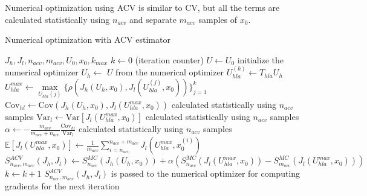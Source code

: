 \documentclass{article}
\begin{document}
Numerical optimization using ACV is similar to CV, but all the terms are calculated statistically using $n_{acv}$ and separate
$m_{acv}$ samples of $x_0$.

\begin{algorithm}
  \caption{Numerical optimization with ACV estimator}
  \begin{algorithmic}
    \Require $J_h, J_l, n_{acv}, m_{acv}, U_0, x_0, k_{max}$
    \State $k \gets 0$ (iteration counter)
    \State $U \gets U_0$ initialize the numerical optimizer
    \State $U_h \gets$ $U$ from the numerical optimizer
    \State $U_{hla}^{(k)} \gets T_{hla} U_h$
    \State $U_{hla}^{max} \gets \underset{U_{hla}(j)} \max \{\rho(J_h(U_h, x_0), J_l(U_{hla}^{(j)}, x_0))\}_{j=1}^k$
    \State $\text{Cov}_{hl} \gets \text{Cov}(J_h(U_h, x_0), J_l(U_{hla}^{max}, x_0))$ calculated statistically using $n_{acv}$ samples
    \State $\text{Var}_l \gets \text{Var}[J_l(U_{hla}^{max}, x_0)]$ calculated statistically using $n_{acv}$ samples
    \State $\alpha \gets -\frac{m_{acv}}{m_{acv} + n_{acv}} \frac{\text{Cov}_{hl}}{\text{Var}_l}$ calculated statistically using $n_{acv}$ samples
    \State $\mathbb{E}[J_l(U_{hla}^{max}, x_0)] \gets \frac{1}{m_{acv}} \sum_{i=n_{acv}}^{n_{acv}+m_{acv}} J_l(U_{hla}^{max}, x_0^{(i)})$
    \State $S_{n_{acv},m_{acv}}^{ACV}(J_h, J_l) \gets S_{n_{acv}}^{MC}(J_h(U_h, x_0)) + \alpha (S_{n_{acv}}^{MC}(J_l(U_{hla}^{max}, x_0)) - S_{m_{acv}}^{MC}(J_l(U_{hla}^{max}, x_0)))$
    \State $k \gets k + 1$
    \State $S_{n_{acv},m_{acv}}^{ACV}(J_h, J_l)$ is passed to the numerical optimizer for computing gradients for the next iteration
    \EndWhile
  \end{algorithmic}
\end{algorithm}
\end{document}
